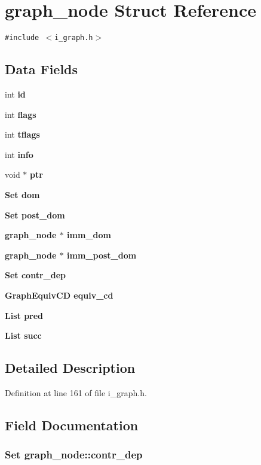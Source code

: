 \section{graph\_\-node Struct Reference}
\label{structgraph__node}
{\tt \#include $<$i\_\-graph.h$>$}

\subsection*{Data Fields}
\begin{CompactItemize}
\item 
int \bf{id}
\item 
int \bf{flags}
\item 
int \bf{tflags}
\item 
int \bf{info}
\item 
void $\ast$ \bf{ptr}
\item 
\bf{Set} \bf{dom}
\item 
\bf{Set} \bf{post\_\-dom}
\item 
\bf{graph\_\-node} $\ast$ \bf{imm\_\-dom}
\item 
\bf{graph\_\-node} $\ast$ \bf{imm\_\-post\_\-dom}
\item 
\bf{Set} \bf{contr\_\-dep}
\item 
\bf{Graph\-Equiv\-CD} \bf{equiv\_\-cd}
\item 
\bf{List} \bf{pred}
\item 
\bf{List} \bf{succ}
\end{CompactItemize}


\subsection{Detailed Description}




Definition at line 161 of file i\_\-graph.h.

\subsection{Field Documentation}
\subsubsection{\setlength{\rightskip}{0pt plus 5cm}\bf{Set} \bf{graph\_\-node::contr\_\-dep}}\label{structgraph__node_5d8a2381f69d534756b598a7d85c5834}




